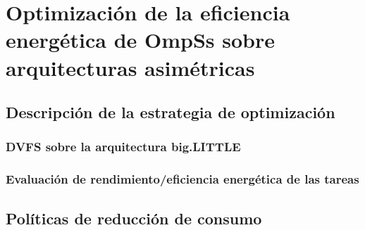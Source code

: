 \cleardoublepage

\chapter{Optimización de la eficiencia energética de OmpSs sobre arquitecturas asimétricas}
\label{ch:chapter5}

\section{Descripción de la estrategia de optimización}

\subsection{DVFS sobre la arquitectura big.LITTLE}

\subsection{Evaluación de rendimiento/eficiencia energética de las tareas}


\section{Políticas de reducción de consumo}

